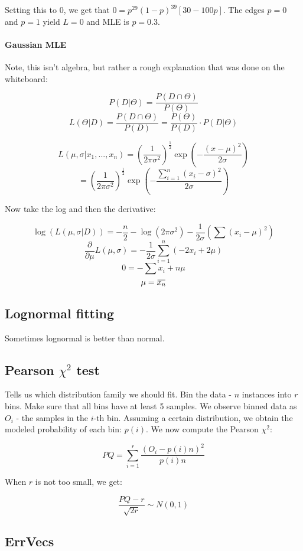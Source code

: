 \documentclass[a4paper]{article}
\newcommand{\mean}[1]{\mkern 1.5mu\overline{\mkern-1.5mu#1\mkern-1.5mu}\mkern 1.5mu}
\begin{document}
Setting this to 0, we get that $0=p^{29}(1-p)^{39} [30-100p]$. The edges $p=0$ and $p=1$ yield $L=0$ and MLE is $p=0.3$.

\paragraph{Gaussian MLE}


Note, this isn't algebra, but rather a rough explanation that was done on the whiteboard:

\[P(D|\Theta)=\frac{P(D\cap\Theta)}{P(\Theta)}\]
\[L(\Theta|D)=\frac{P(D\cap\Theta)}{P(D)}=\frac{P(\Theta)}{P(D)}\cdot P(D|\Theta)\]

\[L(\mu, \sigma|x_1,...,x_n)=\left( \frac{1}{2\pi\sigma^2} \right)^{\frac{1}{2}} \exp\left(-\frac{(x-\mu)^2}{2\sigma}\right)\]
\[=\left( \frac{1}{2\pi\sigma^2} \right)^{\frac{1}{2}} \exp\left( -\frac{\sum_{i=1}^n (x_i-\sigma)^2}{2\sigma} \right)\]

Now take the log and then the derivative:

\[\log(L(\mu, \sigma|D))=-\frac{n}{2} -\log (2\pi\sigma^2) - \frac{1}{2\sigma} \left(\sum (x_i-\mu)^2 \right)\]
\[\frac{\partial}{\partial\mu}L(\mu, \sigma)=-\frac{1}{2\sigma} \sum_{i=1}^n (-2x_i+2\mu)\]
\[0=-\sum x_i + n \mu\]
\[\mu=\mean{x_n}\]

\subsection{Lognormal fitting}
Sometimes lognormal is better than normal.

\subsection{Pearson \texorpdfstring{$\chi^2$}{chi squared} test}
Tells us which distribution family we should fit.
Bin the data - $n$ instances into $r$ bins.
Make sure that all bins have at least 5 samples.
We observe binned data as $O_i$ - the samples in the $i$-th bin.
Assuming a certain distribution, we obtain the modeled probability of each bin: $p(i)$.
We now compute the Pearson $\chi^2$:

\[PQ=\sum_{i=1}^r \frac{(O_i - p(i)n)^2}{p(i)n}\]

When $r$ is not too small, we get:

\[\frac{PQ-r}{\sqrt{2r}} \sim N(0,1)\]

\subsection{ErrVecs}
\end{document}
